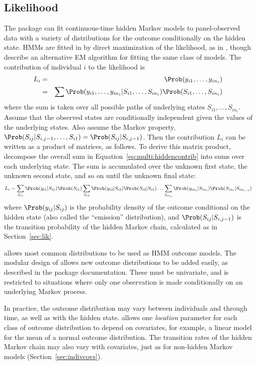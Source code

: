 \documentclass[article,shortnames]{jss}
\begin{document}
\subsection{Likelihood}

The  package can fit continuous-time hidden Markov models to
panel-observed data with a variety of distributions for the outcome
conditionally on the hidden state.  HMMs are fitted in  by
direct maximization of the likelihood, as in \citet{sattlong}, though
\citet{bureau:jss} describe an alternative EM algorithm for fitting
the same class of models.  The contribution of individual $i$ to the
likelihood is
\begin{eqnarray}
  \label{eq:multi:hiddencontrib}
  L_i     & = & \Prob(y_{i1}, \ldots, y_{in_i})\\
  & = & \sum \Prob(y_{i1}, \ldots, y_{in_i} | S_{i1}, \ldots, S_{in_i})
  \Prob(S_{i1}, \ldots, S_{in_i}) \nonumber
\end{eqnarray}
where the sum is taken over all possible paths of underlying states
$S_{i1}, \ldots, S_{in_i}$.  Assume that the observed states are
conditionally independent given the values of the underlying states.
Also assume the Markov property, $\Prob(S_{ij}|S_{i,j-1}, \ldots, S_{i1})
= \Prob(S_{ij}|S_{i,j-1})$.  Then the contribution $L_i$ can be written
as a product of matrices, as follows. To derive this matrix product,
decompose the overall sum in Equation~\ref{eq:multi:hiddencontrib}
into sums over each underlying state. The sum is accumulated over the
unknown first state, the unknown second state, and so on until the
unknown final state:
\[
L_i  =  \sum_{S_{i1}} \Prob(y_{i1}|S_{i1})\Prob(S_{i1}) \sum_{S_{i2}} \Prob(y_{i2}|S_{i2})\Prob(S_{i2}|S_{i1}) \ldots \sum_{S_{in_i}} \Prob(y_{in_i}|S_{in_i}) \Prob(S_{in_i}|S_{in_{i-1}})
\]
where $\Prob(y_{ij}|S_{ij})$ is the probability density of the outcome
conditional on the hidden state (also called the ``emission''
distribution), and $\Prob(S_{ij}|S_{i,j-1})$ is the transition
probability of the hidden Markov chain, calculated as in
Section~\ref{sec:lik}.

 allows most common distributions to be used as HMM outcome
models.  The modular design of  allows new outcome
distributions to be added easily, as described in the package
documentation.  These must be univariate, and  is restricted
to situations where only one observation is made conditionally on an
underlying Markov process.

In practice, the outcome distribution may vary between individuals and
through time, as well as with the hidden state.  allows one
\emph{location} parameter for each class of outcome distribution to
depend on covariates, for example, a linear model for the mean of a
normal outcome distribution.  The transition rates of the hidden
Markov chain may also vary with covariates, just as for non-hidden
Markov models (Section~\ref{sec:indivcovs}).
\end{document}
